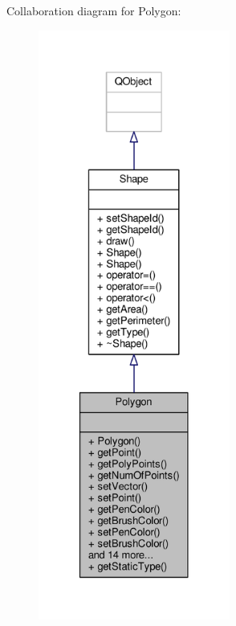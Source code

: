 Collaboration diagram for Polygon\+:\nopagebreak
\begin{figure}[H]
\begin{center}
\leavevmode
\includegraphics[height=550pt]{classPolygon__coll__graph}
\end{center}
\end{figure}
